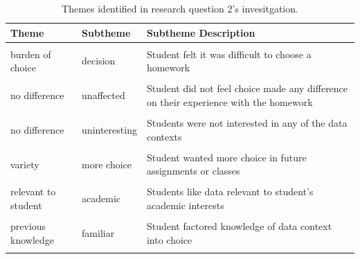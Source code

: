 \documentclass[
  letterpaper,
  DIV=11,
  numbers=noendperiod]{scrartcl}
\begin{document}
\begin{longtable}[t]{>{\raggedright\arraybackslash}p{1in}>{\raggedright\arraybackslash}p{1in}>{\raggedright\arraybackslash}p{4in}}

\caption{\label{tbl-r2-themes}Themes identified in research question 2's
invesitgation.}

\tabularnewline

\toprule
Theme & Subtheme & Subtheme Description\\
\midrule
\cellcolor{gray!10}{burden of choice} & \cellcolor{gray!10}{time} & \cellcolor{gray!10}{Student noted the extra time involved with making a choice of data context}\\
burden of choice & decision & Student felt it was difficult to choose a homework\\
\cellcolor{gray!10}{collaborating} & \cellcolor{gray!10}{peers} & \cellcolor{gray!10}{Peers were working on different assignments, so sharing work or getting help was harder}\\
no difference & unaffected & Student did not feel choice made any difference on their experience with the homework\\
\cellcolor{gray!10}{no difference} & \cellcolor{gray!10}{same} & \cellcolor{gray!10}{Student thought the choice of data context was unimportant since the investigation steps were the same}\\
\addlinespace
no difference & uninteresting & Students were not interested in any of the data contexts\\
\cellcolor{gray!10}{variety} & \cellcolor{gray!10}{variety} & \cellcolor{gray!10}{Student appreciated variety of data contexts}\\
variety & more choice & Student wanted more choice in future assignments or classes\\
\cellcolor{gray!10}{relevant to student} & \cellcolor{gray!10}{relatable} & \cellcolor{gray!10}{Student liked having data they could relate to}\\
relevant to student & academic & Students like data relevant to student's academic interests\\
\addlinespace
\cellcolor{gray!10}{relevant to student} & \cellcolor{gray!10}{interesting} & \cellcolor{gray!10}{Students like having data contexts they found interesting}\\
previous knowledge & familiar & Student factored knowledge of data context into choice\\
\cellcolor{gray!10}{better experience} & \cellcolor{gray!10}{motivating} & \cellcolor{gray!10}{Student felt more motivated to do the homework}\\

\end{longtable}
\end{document}
